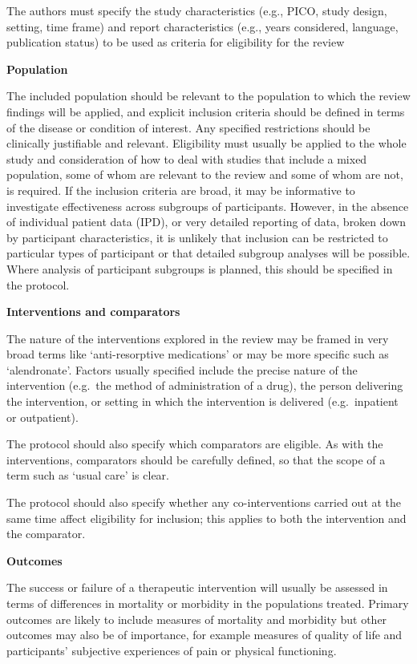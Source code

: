 \documentclass[
  11pt,
  a4paper,
  DIV=11,
  numbers=noendperiod]{scrreprt}
\begin{document}
The authors must specify the study characteristics (e.g., PICO, study
design, setting, time frame) and report characteristics (e.g., years
considered, language, publication status) to be used as criteria for
eligibility for the review

\textbf{Population}

The included population should be relevant to the population to which
the review findings will be applied, and explicit inclusion criteria
should be defined in terms of the disease or condition of interest. Any
specified restrictions should be clinically justifiable and relevant.
Eligibility must usually be applied to the whole study and consideration
of how to deal with studies that include a mixed population, some of
whom are relevant to the review and some of whom are not, is required.
If the inclusion criteria are broad, it may be informative to
investigate effectiveness across subgroups of participants. However, in
the absence of individual patient data (IPD), or very detailed reporting
of data, broken down by participant characteristics, it is unlikely that
inclusion can be restricted to particular types of participant or that
detailed subgroup analyses will be possible. Where analysis of
participant subgroups is planned, this should be specified in the
protocol.

\textbf{Interventions and comparators}

The nature of the interventions explored in the review may be framed in
very broad terms like `anti-resorptive medications' or may be more
specific such as `alendronate'. Factors usually specified include the
precise nature of the intervention (e.g.~the method of administration of
a drug), the person delivering the intervention, or setting in which the
intervention is delivered (e.g.~inpatient or outpatient).

The protocol should also specify which comparators are eligible. As with
the interventions, comparators should be carefully defined, so that the
scope of a term such as `usual care' is clear.

The protocol should also specify whether any co-interventions carried
out at the same time affect eligibility for inclusion; this applies to
both the intervention and the comparator.

\textbf{Outcomes}

The success or failure of a therapeutic intervention will usually be
assessed in terms of differences in mortality or morbidity in the
populations treated. Primary outcomes are likely to include measures of
mortality and morbidity but other outcomes may also be of importance,
for example measures of quality of life and participants' subjective
experiences of pain or physical functioning.
\end{document}
